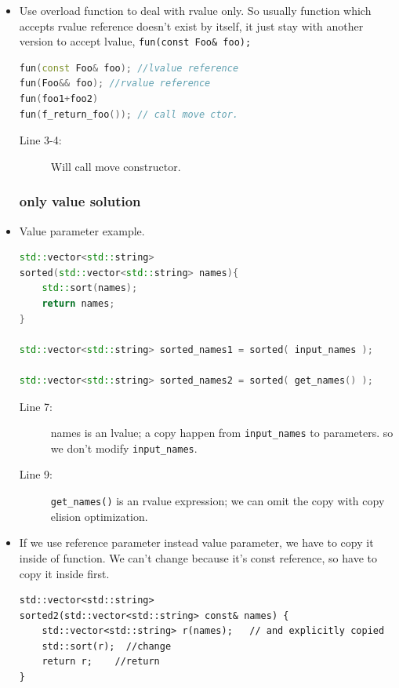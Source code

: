 \documentclass[a4paper,11pt,twoside]{book}
\begin{document}
\begin{itemize}
\item Use overload function to deal with rvalue only. So usually function which accepts rvalue reference doesn't exist by itself, it just stay with another version to accept lvalue, \texttt{fun(const Foo\& foo);}
\begin{lstlisting}[frame=single, language=c++]
fun(const Foo& foo); //lvalue reference
fun(Foo&& foo); //rvalue reference
fun(foo1+foo2) 
fun(f_return_foo()); // call move ctor.
\end{lstlisting}
\begin{description}
	\item[Line 3-4:] Will call move constructor.
\end{description}

\subsubsection{only value solution}

\item Value parameter example.

\begin{lstlisting}[frame=single, language=c++]
std::vector<std::string> 
sorted(std::vector<std::string> names){
	std::sort(names);
	return names;
}

std::vector<std::string> sorted_names1 = sorted( input_names );

std::vector<std::string> sorted_names2 = sorted( get_names() );
\end{lstlisting}
\begin{description}
	\item[Line 7:] names is an lvalue; a copy happen from \texttt{input\_names} to parameters. so we don't modify \texttt{input\_names}.

	\item[Line 9:] \texttt{get\_names()} is an rvalue expression; we can omit the copy with copy elision optimization.

\end{description}

\item If we use reference parameter instead value parameter, we have to copy it inside of function. We can't change because it's const reference, so have to copy it inside first. 

\begin{lstlisting}[numbers=none]
std::vector<std::string> 
sorted2(std::vector<std::string> const& names) {
	std::vector<std::string> r(names);   // and explicitly copied
	std::sort(r);  //change
	return r;    //return
}
\end{lstlisting}




\end{itemize}
\end{document}
